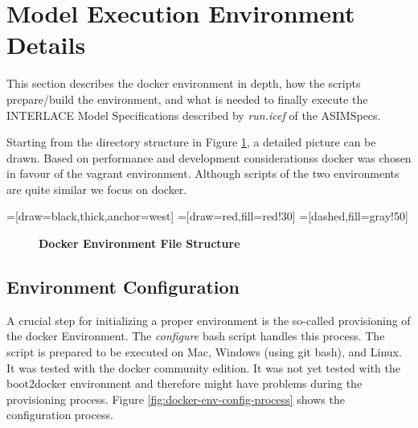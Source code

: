 \section{Model Execution Environment Details}
\label{sec:exec-env-model-details}

This section describes the docker environment in depth, how the scripts prepare/build the environment, and what is needed to finally execute the INTERLACE Model Specifications described by \textit{run.icef} of the ASIMSpecs.

Starting from the directory structure in Figure \ref{fig:docker-env-file-struct}, a detailed picture can be drawn. Based on performance and development considerationss docker was chosen in favour of the vagrant environment. Although scripts of the two environments are quite similar we focus on docker.

=[draw=black,thick,anchor=west]
=[draw=red,fill=red!30]
=[dashed,fill=gray!50]
\begin{figure}[htbp]
\centering
{}
\caption{\bf\small Docker Environment File Structure}
\label{fig:docker-env-file-struct}
\end{figure}

\subsection{Environment Configuration}
A crucial step for initializing a proper environment is the so-called provisioning of the docker Environment. The \textit{configure} bash script handles this process. The script is prepared to be executed on Mac, Windows (using git bash), and Linux. It was tested with the docker community edition. It was not yet tested with the boot2docker environment and therefore might have problems during the provisioning process. Figure \ref{fig:docker-env-config-process} shows the configuration process.

